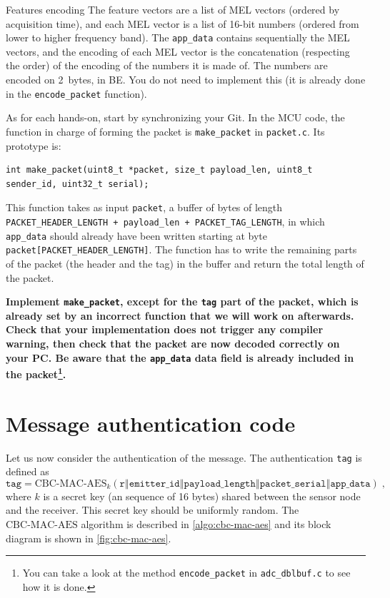 \begin{bclogo}[couleur = gray!20, arrondi = 0.2, logo=\bcinfo]{Features encoding}
    The feature vectors are a list of MEL vectors (ordered by acquisition
    time), and each MEL vector is a list of 16-bit numbers (ordered from lower
    to higher frequency band).
    The \texttt{app\_data} contains sequentially the MEL vectors, and the
    encoding of each MEL vector is the concatenation (respecting the order) of
    the encoding of the numbers it is made of.  The numbers are encoded on
    2~bytes, in BE.
    You do not need to implement this (it is already done in the \verb|encode_packet| function).
\end{bclogo}

As for each hands-on, start by synchronizing your Git. In the MCU code, the function in charge of forming the packet is
\verb|make_packet| in \texttt{packet.c}.
Its prototype is:
\begin{lstlisting}[style=customc]
int make_packet(uint8_t *packet, size_t payload_len, uint8_t sender_id, uint32_t serial);
\end{lstlisting}
This function takes as input \texttt{packet}, a buffer of bytes of length
\texttt{PACKET\_HEADER\_LENGTH + payload\_len + PACKET\_TAG\_LENGTH}, in
which \texttt{app\_data} should already have been written starting at byte\\
\verb|packet[PACKET_HEADER_LENGTH]|.
The function has to write the remaining parts of the packet (the header and the tag) in the buffer and return the total length of the packet.

\textbf{
    Implement \texttt{make\_packet}, except for the \texttt{tag} part of the
    packet, which is already set by an incorrect function that we will work on afterwards.
    Check that your implementation does not trigger any compiler warning, then
    check that the packet are now decoded correctly on your PC. Be aware that the \texttt{app\_data} data field is already included in the packet\footnote{You can take a look at the method \texttt{encode\_packet} in \texttt{adc\_dblbuf.c} to see how it is done.}.
}

\section{Message authentication code}

Let us now consider the authentication of the message. The authentication
\texttt{tag} is defined as
\[
    \texttt{tag} = \text{CBC-MAC-AES}_{k}\left(
        \texttt{r$\mathbin\Vert$emitter\_id$\mathbin\Vert$payload\_length$\mathbin\Vert$packet\_serial$\mathbin\Vert$app\_data}
    \right)\;,
\]
where $k$ is a secret key (an sequence of 16 bytes) shared between the sensor
node and the receiver. This secret key should be uniformly random. The $\text{CBC-MAC-AES}$ algorithm is described in \autoref{algo:cbc-mac-aes} and its block diagram is shown in \autoref{fig:cbc-mac-aes}.


